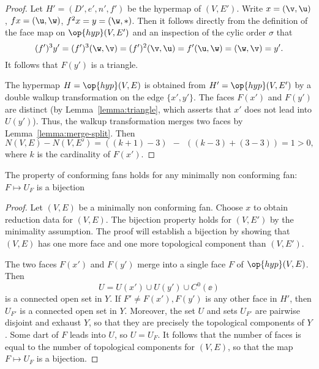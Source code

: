 \begin{proof} Let $H'=(D',e',n',f')$ be the hypermap of $(V,E')$.
Write $x = (\v,\u)$, $f x = (\u,\w)$, $f^2 x = y = (\w,*)$.
Then it follows directly from the definition of the face map on $\op{hyp}(V,E')$
and an inspection of the cylic order $\sigma$ that
\begin{displaymath}
(f')^3 y' = (f')^3 (\w,\v) = (f')^2(\v,\u) = f' (\u,\w) = (\w,\v) = y'.
\end{displaymath}
It follows that $F(y')$ is a triangle.

The hypermap $H=\op{hyp}(V,E)$ is obtained from
$H'=\op{hyp}(V,E')$ by a double walkup transformation on the edge
$\{x',y'\}$.  The faces $F(x')$ and $F(y')$ are distinct (by
Lemma~\ref{lemma:triangle}, which asserts that $x'$ does not lead
into $U(y')$).  Thus, the walkup transformation merges two faces by Lemma~\ref{lemma:merge-split}.
Then
\begin{displaymath}N(V,E) - N(V,E') = ((k+1)-3) ~~-~~ ((k-3) +
(3-3)) = 1 >0,\end{displaymath} where $k$ is the cardinality of
$F(x')$.
\end{proof}


\begin{lemma}[]
The property  of conforming fans holds for any
minimally non conforming fan: $F\mapsto U_F$ is a bijection
\end{lemma}

\begin{proof} Let $(V,E)$ be a minimally non conforming fan.  
Choose $x$ to obtain reduction data
for $(V,E)$.  
 The bijection property holds
for $(V,E')$ by the minimality assumption.  The proof will establish a bijection by showing
that $(V,E)$ has one more face
and one more topological component than $(V,E')$.

The
two faces $F(x')$ and $F(y')$ merge into a single face $F$ of
$\op{hyp}(V,E)$.  Then
\begin{equation}\label{eqn:U}
U= U(x')\cup U(y')\cup C^0(\ee)
\end{equation} 
is a connected open set in $Y$.  If $F'\ne F(x'),F(y')$ is any other
face in $H'$, then $U_{F'}$ is a connected open set in $Y$.  Moreover,
the set $U$ and sets $U_{F'}$ are pairwise disjoint and exhaust $Y$,
so that they are precisely the topological components of $Y$.  Some
dart of $F$ leads into $U$, so $U=U_F$. 
It follows that the number of
faces is equal to the number of topological components for $(V,E)$, so that the
map $F\mapsto U_F$ is a bijection.
\end{proof}


